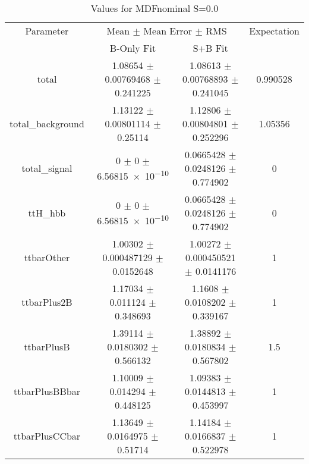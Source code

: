 \begin{table}
\centering
\caption{Values for MDFnominal S=0.0}
\begin{tabular}{cccc}
\toprule
Parameter & \multicolumn{2}{c}{Mean $\pm$ Mean Error $\pm$ RMS} & Expectation\\
 & B-Only Fit & S+B Fit & \\
\midrule
total & \num{1.08654} $\pm$ \num{0.00769468} $\pm$ \num{0.241225} & \num{1.08613} $\pm$ \num{0.00768893} $\pm$ \num{0.241045} & \num{0.990528}\\
total\_background & \num{1.13122} $\pm$ \num{0.00801114} $\pm$ \num{0.25114} & \num{1.12806} $\pm$ \num{0.00804801} $\pm$ \num{0.252296} & \num{1.05356}\\
total\_signal & \num{0} $\pm$ \num{0} $\pm$ \num{6.56815e-10} & \num{0.0665428} $\pm$ \num{0.0248126} $\pm$ \num{0.774902} & \num{0}\\
ttH\_hbb & \num{0} $\pm$ \num{0} $\pm$ \num{6.56815e-10} & \num{0.0665428} $\pm$ \num{0.0248126} $\pm$ \num{0.774902} & \num{0}\\
ttbarOther & \num{1.00302} $\pm$ \num{0.000487129} $\pm$ \num{0.0152648} & \num{1.00272} $\pm$ \num{0.000450521} $\pm$ \num{0.0141176} & \num{1}\\
ttbarPlus2B & \num{1.17034} $\pm$ \num{0.011124} $\pm$ \num{0.348693} & \num{1.1608} $\pm$ \num{0.0108202} $\pm$ \num{0.339167} & \num{1}\\
ttbarPlusB & \num{1.39114} $\pm$ \num{0.0180302} $\pm$ \num{0.566132} & \num{1.38892} $\pm$ \num{0.0180834} $\pm$ \num{0.567802} & \num{1.5}\\
ttbarPlusBBbar & \num{1.10009} $\pm$ \num{0.014294} $\pm$ \num{0.448125} & \num{1.09383} $\pm$ \num{0.0144813} $\pm$ \num{0.453997} & \num{1}\\
ttbarPlusCCbar & \num{1.13649} $\pm$ \num{0.0164975} $\pm$ \num{0.51714} & \num{1.14184} $\pm$ \num{0.0166837} $\pm$ \num{0.522978} & \num{1}\\
\bottomrule
\end{tabular}
\end{table}